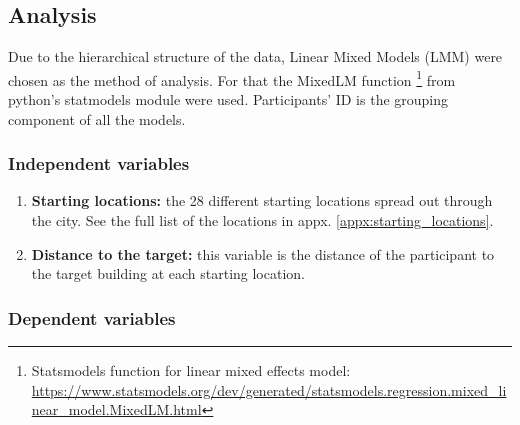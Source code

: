 \subsection{Analysis}
Due to the hierarchical structure of the data, Linear Mixed Models (LMM) were chosen as the method of analysis. For that the MixedLM function \footnote{Statsmodels function for linear mixed effects model: \\ \href{https://www.statsmodels.org/dev/generated/statsmodels.regression.mixed\_linear\_model.MixedLM.html}{https://www.statsmodels.org/dev/generated/statsmodels.regression.mixed\_linear\_model.MixedLM.html}} from python's statmodels module were used. Participants' ID is the grouping component of all the models.

\subsubsection{Independent variables}

\begin{enumerate}
	\item \textbf{Starting locations:} the 28 different starting locations spread out through the city. See the full list of the locations in appx. \ref{appx:starting_locations}. \\
	
	\item \textbf{Distance to the target:} this variable is the distance of the participant to the target building at each starting location.
\end{enumerate}

\subsubsection{Dependent variables}

